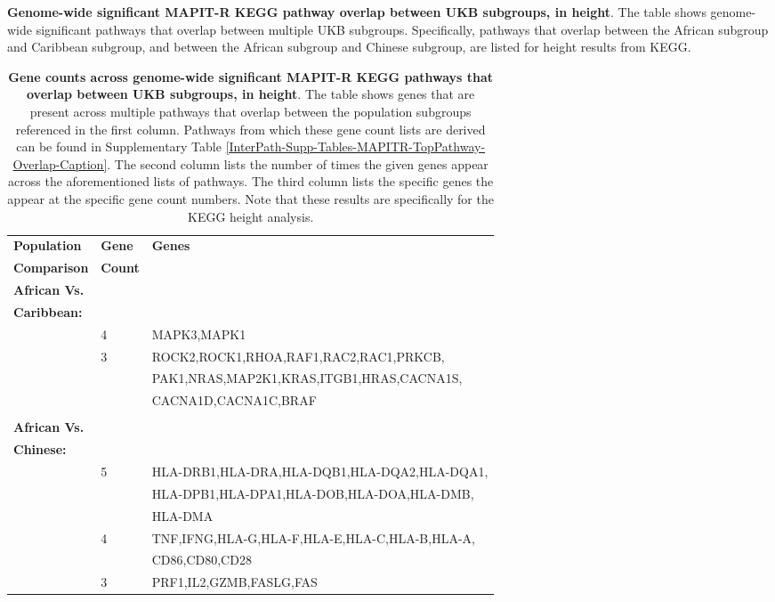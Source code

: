 \documentclass[12pt,a4paper]{article}
\begin{document}
\addtocounter{table}{-1}
\begin{table} [t!]
  \caption{\textbf{Genome-wide significant MAPIT-R KEGG pathway overlap between UKB subgroups, in height}. The table shows genome-wide significant pathways that overlap between multiple UKB subgroups. Specifically, pathways that overlap between the African subgroup and Caribbean subgroup, and between the African subgroup and Chinese subgroup, are listed for height results from KEGG.}
\label{InterPath-Supp-Tables-MAPITR-TopPathway-Overlap-Caption}
\end{table}
\clearpage

\setlength{\footskip}{2cm}
\begin{table}[ht]
\centering
\begin{tabular}{lll}
  \hline
 \textbf{Population} & \textbf{Gene} & \textbf{Genes} \\
 \textbf{Comparison} & \textbf{Count} & \\
  \hline
\textbf{African Vs.} & & \\
\textbf{Caribbean:} & & \\
& 4 & MAPK3,MAPK1 \\
& 3 & ROCK2,ROCK1,RHOA,RAF1,RAC2,RAC1,PRKCB, \\
& & PAK1,NRAS,MAP2K1,KRAS,ITGB1,HRAS,CACNA1S, \\
& & CACNA1D,CACNA1C,BRAF \\
\\
\textbf{African Vs.} & & \\
\textbf{Chinese:} & & \\
& 5 & HLA-DRB1,HLA-DRA,HLA-DQB1,HLA-DQA2,HLA-DQA1, \\
& & HLA-DPB1,HLA-DPA1,HLA-DOB,HLA-DOA,HLA-DMB, \\
& & HLA-DMA \\
& 4 & TNF,IFNG,HLA-G,HLA-F,HLA-E,HLA-C,HLA-B,HLA-A, \\ 
& & CD86,CD80,CD28 \\
& 3 & PRF1,IL2,GZMB,FASLG,FAS \\
   \hline
\end{tabular}
\caption[TBD]{\textbf{Gene counts across genome-wide significant MAPIT-R KEGG pathways that overlap between UKB subgroups, in height}. The table shows genes that are present across multiple pathways that overlap between the population subgroups referenced in the first column. Pathways from which these gene count lists are derived can be found in Supplementary Table \ref{InterPath-Supp-Tables-MAPITR-TopPathway-Overlap-Caption}. The second column lists the number of times the given genes appear across the aforementioned lists of pathways. The third column lists the specific genes the appear at the specific gene count numbers. Note that these results are specifically for the KEGG height analysis.}
\label{InterPath-Supp-Tables-MAPITR-TopPathway-GeneCounts-Overlap}
\end{table}
\clearpage
\setlength{\footskip}{1cm}
\end{document}
